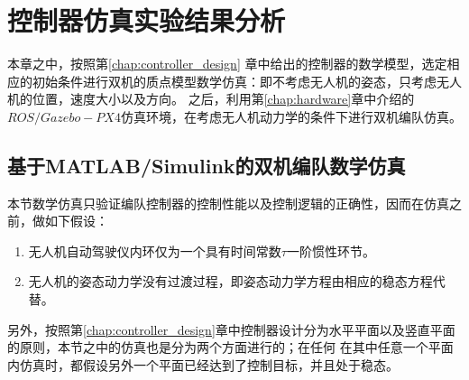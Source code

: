 \chapter{控制器仿真实验结果分析}
\label{chap:simulatin_expermient}
本章之中，按照第\ref{chap:controller_design}
章中给出的控制器的数学模型，选定相应的初始条件进行双机的质点模型数学仿真：即不考虑无人机的姿态，只考虑无人机的位置，速度大小以及方向。
之后，利用第\ref{chap:hardware}章中介绍的$ROS/Gazebo-PX4$仿真环境，在考虑无人机动力学的条件下进行双机编队仿真。
\section{基于MATLAB/Simulink的双机编队数学仿真}
本节数学仿真只验证编队控制器的控制性能以及控制逻辑的正确性，因而在仿真之前，做如下假设：
\begin{enumerate}
\item 无人机自动驾驶仪内环仅为一个具有时间常数$\tau$一阶惯性环节。
\item 无人机的姿态动力学没有过渡过程，即姿态动力学方程由相应的稳态方程代替。
\end{enumerate}
另外，按照第\ref{chap:controller_design}章中控制器设计分为水平平面以及竖直平面的原则，本节之中的仿真也是分为两个方面进行的；在任何
在其中任意一个平面内仿真时，都假设另外一个平面已经达到了控制目标，并且处于稳态。

